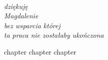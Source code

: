 \documentclass[
  a4paper,
  twoside,
  justified,
  nobib,
  marginals=raggedright,
]{tufte-book}
\begin{document}
\frontmatter
\maketitle

\cleardoublepage
\thispagestyle{empty}
~\vfill
\vfill
\begin{fullwidth}
\raggedleft\noindent\fontsize{16}{26}\selectfont\itshape
\nohyphenation
dziękuję \\
Magdalenie \\
bez wsparcia której \\
ta praca nie zostałaby ukończona
\end{fullwidth}
\vfill

\tableofcontents



\mainmatter

{chapter}
{chapter}
{chapter}
\end{document}
